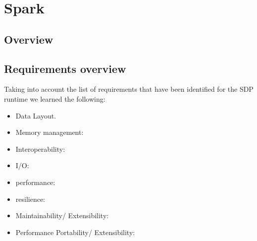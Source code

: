 \section{Spark}

\subsection{Overview}

\subsection{Requirements overview}

Taking into account the list of requirements that have been identified for the SDP runtime we learned the following: 
\begin{itemize}
\item Data Layout. 
\item Memory management: 
\item Interoperability: 
\item I/O: 
\item performance: 
\item resilience: 
\item Maintainability/ Extensibility: 
\item Performance Portability/ Extensibility: 
\end{itemize}


